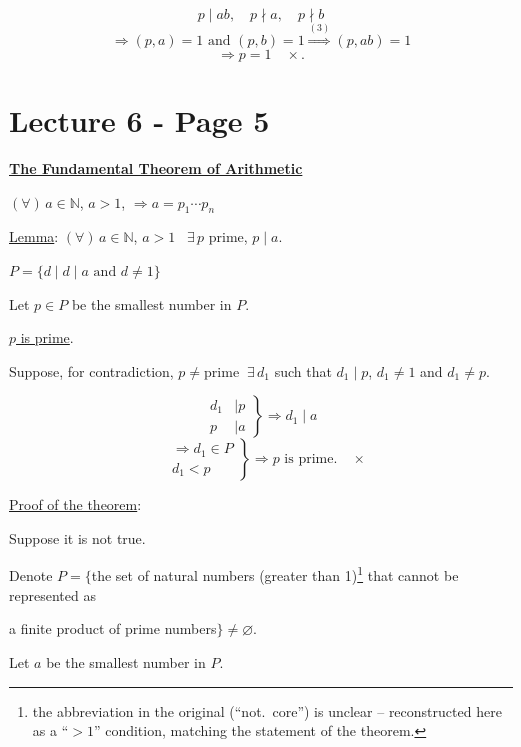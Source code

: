 \[
p\mid ab,\quad p\nmid a,\quad p\nmid b
\]
\[
\Rightarrow (p,a)=1 \text{ and } (p,b)=1 \overset{(3)}{\Longrightarrow} (p,ab)=1
\]
\[
\Rightarrow p=1 \quad \times.
\]




\section*{Lecture 6 - Page 5}

\noindent\underline{\textbf{The Fundamental Theorem of Arithmetic}}

\bigskip
\noindent $(\forall)\,a\in\mathbb{N}$, $a>1$, $\Rightarrow a=p_1\cdots p_n$


\bigskip
\noindent\underline{Lemma}: $(\forall)\,a\in\mathbb{N}$, $a>1$ \ $\exists\,p$ prime, $p\mid a$.

\bigskip
\noindent $P=\{d \mid d\mid a \text{ and } d\neq 1\}$

\bigskip
\noindent Let $p\in P$ be the smallest number in $P$.

\noindent\underline{$p$ is prime}.

\bigskip
\noindent Suppose, for contradiction, $p\neq$prime $\ \exists\,d_1$ such that $d_1\mid p$, $d_1\neq 1$ and $d_1\neq p$.

\[
\left.\begin{aligned} d_1&\mid p\\ p&\mid a\end{aligned}\right\} \Rightarrow d_1\mid a
\]
\[
\left.\begin{aligned} &\Rightarrow d_1\in P\\ &d_1<p\end{aligned}\right\} \Rightarrow p\text{ is prime.} \quad \times
\]

\bigskip
\noindent\underline{Proof of the theorem}:

\noindent Suppose it is not true.

\noindent Denote $P=\big\{$the set of natural numbers (greater than 1)\footnote{the abbreviation in the original (``not.\ core'') is unclear -- reconstructed here as a ``$>1$'' condition, matching the statement of the theorem.} that cannot be represented as

\noindent a finite product of prime numbers$\big\} \neq \varnothing$.

\bigskip
\noindent Let $a$ be the smallest number in $P$.

